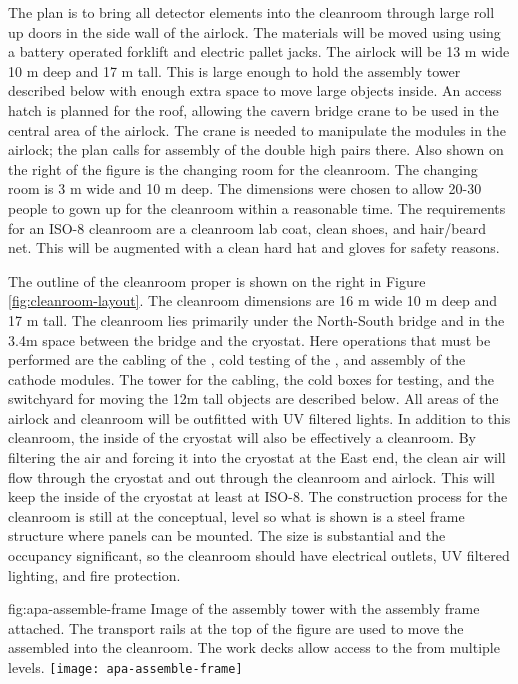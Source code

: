The plan is to bring all detector elements into the cleanroom through large roll up doors in the side wall of the airlock. The materials will be moved using using  a battery operated forklift and electric pallet jacks. The airlock will be  13 \si{m} wide 10 \si{m} deep and 17 \si{m} tall. This is large enough to hold the  assembly tower described below with enough extra space to move large objects inside. An access hatch is planned for the roof, allowing the cavern bridge crane to be used in the central area of the airlock. The crane is needed to manipulate the  modules in the airlock; the plan calls for assembly of the double high  pairs there. Also shown on the right of the figure is the changing room for the cleanroom. The changing room is 3 \si{m} wide and 10 \si{m} deep. The dimensions were chosen to allow 20-30 people to gown up for the cleanroom within a reasonable time. The requirements for an ISO-8 cleanroom are a cleanroom lab coat, clean shoes, and hair/beard net. This will be augmented with a clean hard hat and gloves for safety reasons. 

The outline of the cleanroom proper is shown on the right in Figure \ref{fig:cleanroom-layout}. The cleanroom dimensions are 16 \si{m} wide 10 \si{m} deep and 17 \si{m} tall. The cleanroom lies primarily under the North-South bridge and in the 3.4m space between the bridge and the cryostat. Here operations that must be performed are the cabling of the , cold testing of the , and assembly of the cathode  modules. The tower for the  cabling, the cold boxes for testing, and the switchyard for moving the 12m tall objects are described below. All areas of the airlock and cleanroom will be outfitted with UV filtered lights. In addition to this cleanroom, the inside of the cryostat will also be effectively a cleanroom.  By filtering the air and forcing it  into the cryostat at the East end, the clean air will flow through the cryostat and out through the cleanroom and airlock. This will keep the inside of the cryostat at least at ISO-8. The construction process for the cleanroom is still at the conceptual, level so what is shown is a steel frame structure where panels can be mounted. The size is substantial and the occupancy significant, so the cleanroom should have electrical outlets, UV filtered lighting, and fire protection. 


\begin{dunefigure}{fig:apa-assemble-frame}
  {Image of the  assembly tower with the  assembly frame attached. The transport rails at the top of the figure are used to move the assembled  into the cleanroom. The work decks allow access to the  from multiple levels. }
\texttt{[image: apa-assemble-frame]}
\end{dunefigure}

